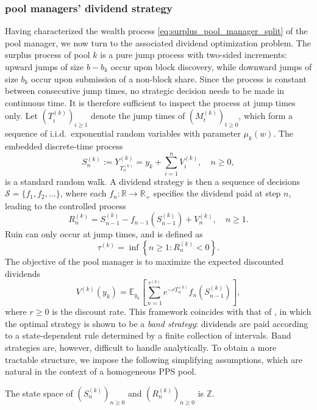 \subsubsection{pool managers' dividend strategy}

Having characterized the wealth process \eqref{eq:surplus_pool_manager_split} of the pool
manager, we now turn to the associated dividend optimization problem. The surplus process of
pool $k$ is a pure jump process with two-sided increments: upward jumps of size $b - b_k$ occur
upon block discovery, while downward jumps of size $b_k$ occur upon submission of a non-block
share. Since the process is constant between consecutive jump times, no strategic decision needs
to be made in continuous time. It is therefore sufficient to inspect the process at jump times only. Let $(T_i^{(k)})_{i \geq 1}$ denote the jump times of $(M_t^{(k)})_{t \geq 0}$, which form a
sequence of i.i.d.\ exponential random variables with parameter $\mu_k(w)$. The embedded
discrete-time process
\[
    S_n^{(k)} := Y_{T_n^{(k)}}^{(k)} = y_k + \sum_{i=1}^n V_i^{(k)}, \quad n \geq 0,
\]
is a standard random walk. A dividend strategy is then a sequence of decisions
$\mathcal{S} = \{f_1, f_2, \ldots\}$, where each $f_n : \mathbb{R} \to \mathbb{R}_+$ specifies
the dividend paid at step $n$, leading to the controlled process
\[
    R_n^{(k)} = S_{n-1}^{(k)} - f_{n-1}\!\left(S_{n-1}^{(k)}\right) + V_n^{(k)},
    \quad n \geq 1.
\]
Ruin can only occur at jump times, and is defined as
\[
    \tau^{(k)} = \inf\!\left\{n \geq 1 : R_n^{(k)} < 0\right\}.
\]
The objective of the pool manager is to maximize the expected discounted dividends
\[
    V^{(k)}(y_k) = \mathbb{E}_{y_k}\!\left[
        \sum_{n=1}^{\tau^{(k)}} e^{-r T_n^{(k)}} f_n\!\left(S_{n-1}^{(k)}\right)
    \right],
\]
where $r \geq 0$ is the discount rate. This framework coincides with that of
\citet{albrecher2011randomized}, in which the optimal strategy is shown to be a
\textit{band strategy}: dividends are paid according to a state-dependent rule determined by a
finite collection of intervals. Band strategies are, however, difficult to handle analytically. To obtain a more tractable structure, we impose the following simplifying assumptions, which are natural in the context of
a homogeneous PPS pool.

\begin{hp}\label{ass:integer_state}
The state space of $(S_n^{(k)})_{n \geq 0}$ and $(R_n^{(k)})_{n \geq 0}$ is $\mathbb{Z}$.
\end{hp}

